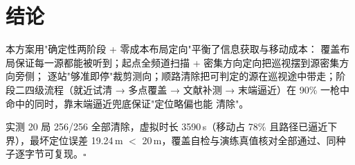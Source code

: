 \documentclass[a4paper,11pt]{ctexart}
\begin{document}
\section{结论}
本方案用"确定性两阶段 + 零成本布局定向"平衡了信息获取与移动成本：
覆盖布局保证每一源都能被听到；起点全频道扫描 + 密集方向定向把巡视摆到源密集方向旁侧；
逐站"够准即停"裁剪测向；顺路清除把可判定的源在巡视途中带走；阶段二四级流程（就近试清 → 
多点覆盖 → 文献补测 → 末端逼近）在 90\% 一枪中命中的同时，靠末端逼近兜底保证"定位略偏也能
清除"。

实测 20 局 256/256 全部清除，虚拟时长 3590\,s（移动占 78\% 且路径已逼近下界），最坏定位误差
19.24\,m $<$ 20\,m，覆盖自检与演练真值核对全部通过、同种子逐字节可复现。$\square$
\end{document}
